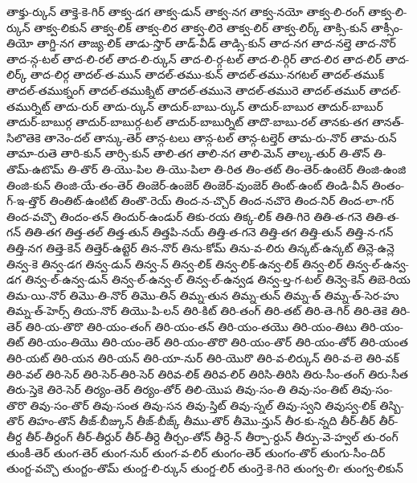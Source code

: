{తాక్తు-ర్కున్
తాక్తె-కె-గిర్
తాక్వ-డగ
తాక్వ-డున్
తాక్వ-నగ
తాక్వ-నయో
తాక్వ-లి-రంగ్
తాక్వ-లి-ర్కున్
తాక్వ-లికున్
తాక్వ-లిక్
తాక్వ-లిర
తాక్వ-లిరె
తాక్వ-లిర్
తాక్వ-లిర్క్
తాక్సి-కున్
తాక్సీం-తియో
తాగ్డి-నగ
తాజ్య-లిక్
తాడు-స్తొర్
తాడ్-వీడ్
తాడ్సి-కున్
తాద-నగ
తాద-నల్తె
తాద-నొర్
తాద-న్గ-టల్
తాద-లి-రల్
తాద-లి-ర్కున్
తాద-లి-ర్గ-టల్
తాద-లి-ర్గిర్
తాద-లిర
తాద-లిర్
తాద-లిర్క్
తాద-లిర్గ
తాదల్-త-మున్
తాదల్-తము-కున్
తాదల్-తము-నగటల్
తాదల్-తముక్
తాదల్-తముక్నంగ్
తాదల్-తముక్నిట్
తాదల్-తమునె
తాదల్-తమురె
తాదల్-తముర్
తాదల్-తముర్నిట్
తాదు-రుర్
తాదు-ర్కున్
తాదుర్-బాబు-ర్కున్
తాదుర్-బాబుర
తాదుర్-బాబుర్
తాదుర్-బాబుర్గ
తాదుర్-బాబుర్గ-టల్
తాదుర్-బాబుర్నిట్
తాదొ-బాబు-రల్
తానకు-తగ
తానత్-సిలొతెకె
తానెం-దల్
తాన్కు-తెర్
తాన్గ-టలు
తాన్గ-టల్
తాన్గ-టల్తెర్
తామ-రు-నొర్
తామ-రున్
తామా-రుతె
తారి-కున్
తార్సి-కున్
తాలి-తగ
తాలి-నగ
తాలి-మెన్
తాల్క-తుర్
తి-తొన్
తి-తొమ్-ఉటొమ్
తి-తొర్
తి-యొ-పిల
తి-యొ-పిలా
తి-రిత
తిం-తట్
తిం-తెర్-ఉంటెర్
తింజి-ఉంజి
తింజి-కున్
తింజి-యే-తం-తెర్
తింజెర్-ఉంజెర్
తింజెర్-వుంజెర్
తింట్-ఉంట్
తిండి-వీన్
తింతం-గ్-ఇ-త్తొర్
తింతిట్-ఉంటిట్
తింతొ-రెయ్
తింద-న-చ్చొర్
తింద-నచొరె
తింద-నిర్
తింద-లా-గర్
తింద-వచ్చొ
తిందం-తన్
తిందుర్-ఉండుర్
తికు-రయ
తిక్క-లిక్
తితి-గిరె
తితి-త-గనె
తితి-త-గన్
తితి-తగ
తిత్త-తల్
తిత్త-తున్
తిత్తపి-నయ్
తిత్తి-త-గనె
తిత్తి-తగ
తిత్తి-తున్
తిత్తి-న-గన్
తిత్తి-నగ
తిత్తె-కెన్
తిత్తెర్-ఉట్టెర్
తిన-నొర్
తిను-కోమ్
తిను-వ-లిరు
తిన్కట్-ఉన్కట్
తిన్లె-ఉన్లె
తిన్వ-కె
తిన్వ-డగ
తిన్వ-డున్
తిన్వ-న్
తిన్వ-లిక్
తిన్వ-లిక్-ఉన్వ-లిక్
తిన్వ-లిర్
తిన్వ-ల్-ఉన్వ-డగ
తిన్వ-ల్-ఉన్వ-డున్
తిన్వ-ల్-ఉన్వ-ల్
తిన్వ-ల్-ఉన్వడ
తిన్వ-ల్త-గ-టల్
తిన్వె-కెన్
తిబె-రియ
తిమ-యి-నొర్
తిమొ-తి-నొర్
తిమొ-తిన్
తిమ్న-తున
తిమ్న-తున్
తిమ్న-త్
తిమ్న-త్-సెర-హు
తిమ్న-త్-హెర్స్
తియ-నొర్
తియొ-పి-లన్
తిరి-కిట్
తిరి-తంగ్
తిరి-తట్
తిరి-తె-గిర్
తిరి-తెకె
తిరి-తెర్
తిరి-య-తొరొ
తిరి-యం-తంగ్
తిరి-యం-తన్
తిరి-యం-తయొ
తిరి-యం-తిటు
తిరి-యం-తిట్
తిరి-యం-తియొ
తిరి-యం-తెర్
తిరి-యం-తొరొ
తిరి-యం-తొర్
తిరి-యం-తోర్
తిరి-యంత
తిరి-యట్
తిరి-యన
తిరి-యన్
తిరి-యా-నుర్
తిరి-యొరొ
తిరి-వ-లిర్కున్
తిరి-వ-లె
తిరి-వక్
తిరి-వల్
తిరి-సెర్
తిరి-సెర్-తిరి-సెర్
తిరివ-లిక్
తిరివ-లిర్
తిరిసి-తిరిసి
తిరు-సీం-తంగ్
తిరు-సీత
తిరు-స్తెకె
తిరె-సెర్
తిర్యం-తెర్
తిర్యం-తోర్
తిలి-యొప
తివు-సం-తి
తివు-సం-తిట్
తివు-సం-తొరొ
తివు-సం-తొర్
తివు-సంత
తివు-సన
తివు-స్తిట్
తివు-స్నల్
తివు-స్వని
తివుస్వ-లిక్
తిస్బి-తొర్
తిహం-తొన్
తీజ్-బీజ్కున్
తీజ్-బీజ్క్
తీము-తొర్
తీమొ-న్తున్
తీర-కు-న్నది
తీర్-తీర్
తీర్-తీర్ద
తీర్-తీర్దంగ్
తీర్-తీర్దుర్
తీర్-తీర్దె
తీర్చం-తోన్
తీర్దె-న్
తీర్పా-ర్దున్
తీర్పు-వె-హ్వల్
తు-రంగ్
తుంకీ-తెర్
తుంగ-తెర్
తుంగ-నుర్
తుంగ-వ-లిర్
తుంగం-తెర్
తుంగం-తొర్
తుంగు-సీం-దిర్
తుంగ్ఙ-వచ్చొ
తుంగ్ఙం-తొమ్
తుంగ్డ-లి-ర్కున్
తుంగ్డ-లిర్
తుంగ్తె-కె-గిరె
తుంగ్వ-లిr
తుంగ్వ-లికున్
}
